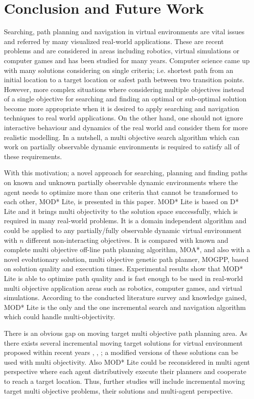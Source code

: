 \section{Conclusion and Future Work}
\label{chapter:conclusion}

Searching, path planning and navigation in virtual environments are vital issues and referred by many visualized real-world applications. These are recent problems and are considered in areas including robotics, virtual simulations or computer games and has been studied for many years. Computer science came up with many solutions considering on single criteria; i.e. shortest path from an initial location to a target location or safest path between two transition points. However, more complex situations where considering multiple objectives instead of a single objective for searching and finding an optimal or sub-optimal solution become more appropriate when it is desired to apply searching and navigation techniques to real world applications. On the other hand, one should not ignore interactive behaviour and dynamics of the real world and consider them for more realistic modelling. In a nutshell, a multi objective search algorithm which can work on partially observable dynamic environments is required to satisfy all of these requirements.

With this motivation; a novel approach for searching, planning and finding paths on known and unknown partially observable dynamic environments  where the agent needs to optimize more than one criteria that cannot be transformed to each other, MOD* Lite, is presented in this paper. MOD* Lite is based on D* Lite and it brings multi objectivity to the solution space successfully, which is required in many real-world problems. It is a domain independent algorithm and could be applied to any partially/fully observable dynamic virtual environment with $n$ different non-interacting objectives. It is compared with known and complete multi objective off-line path planning algorithm, MOA*, and also with a novel evolutionary solution, multi objective genetic path planner, MOGPP, based on solution quality and execution times. Experimental results show that MOD* Lite is able to optimize path quality and is fast enough to be used in real-world multi objective application areas such as robotics, computer games, and virtual simulations. According to the conducted literature survey and knowledge gained, MOD* Lite is the only and the one incremental search and navigation algorithm which could handle multi-objectivity.

There is an obvious gap on moving target multi objective path planning area. As there exists several incremental moving target solutions for virtual environment proposed within recent years \cite{Sun:2009}, \cite{GFR-A*Sun:2010}, \cite{MT-D*Lite:2010}; a modified versions of these solutions can be used with multi objectivity. Also MOD* Lite could be reconsidered in multi agent perspective where each agent distributively execute their planners and cooperate to reach a target location. Thus, further studies will include incremental moving target multi objective problems, their solutions and multi-agent perspective.